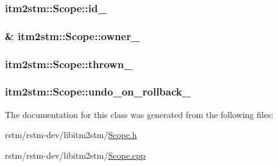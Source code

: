 \hypertarget{classitm2stm_1_1Scope_a54acb98c029fcf6167f5fe38f6f66f61}{
\subsubsection[{id\-\_\-}]{ itm2stm\-::\-Scope\-::id\-\_\-\hspace{0.3cm}{\ttfamily [private]}}}\label{classitm2stm_1_1Scope_a54acb98c029fcf6167f5fe38f6f66f61}
\hypertarget{classitm2stm_1_1Scope_abbfd6d926da8e64737daa37efccb43bf}{
\subsubsection[{owner\-\_\-}]{\& itm2stm\-::\-Scope\-::owner\-\_\-\hspace{0.3cm}{\ttfamily [private]}}}\label{classitm2stm_1_1Scope_abbfd6d926da8e64737daa37efccb43bf}
\hypertarget{classitm2stm_1_1Scope_aa151fee486e7441ea64049ce8f3e0cd0}{
\subsubsection[{thrown\-\_\-}]{ itm2stm\-::\-Scope\-::thrown\-\_\-\hspace{0.3cm}{\ttfamily [private]}}}\label{classitm2stm_1_1Scope_aa151fee486e7441ea64049ce8f3e0cd0}
\hypertarget{classitm2stm_1_1Scope_a866d461e70348a0db9b46627ec81bf8e}{
\subsubsection[{undo\-\_\-on\-\_\-rollback\-\_\-}]{ itm2stm\-::\-Scope\-::undo\-\_\-on\-\_\-rollback\-\_\-\hspace{0.3cm}{\ttfamily [private]}}}\label{classitm2stm_1_1Scope_a866d461e70348a0db9b46627ec81bf8e}


The documentation for this class was generated from the following files\-:\begin{DoxyCompactItemize}
\item 
rstm/rstm-\/dev/libitm2stm/\hyperlink{Scope_8h}{Scope.\-h}\item 
rstm/rstm-\/dev/libitm2stm/\hyperlink{Scope_8cpp}{Scope.\-cpp}\end{DoxyCompactItemize}
